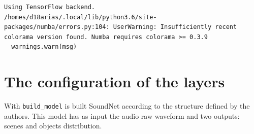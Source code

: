 \documentclass[11pt]{article}
\begin{document}
    \begin{Verbatim}[commandchars=\\\{\}]
Using TensorFlow backend.
/homes/d18arias/.local/lib/python3.6/site-packages/numba/errors.py:104: UserWarning: Insufficiently recent colorama version found. Numba requires colorama >= 0.3.9
  warnings.warn(msg)

    \end{Verbatim}

    \section{The configuration of the
layers}\label{the-configuration-of-the-layers}

With \texttt{build\_model} is built SoundNet according to the structure
defined by the authors. This model has as input the audio raw waveform
and two outputs: scenes and objects distribution.
\end{document}
